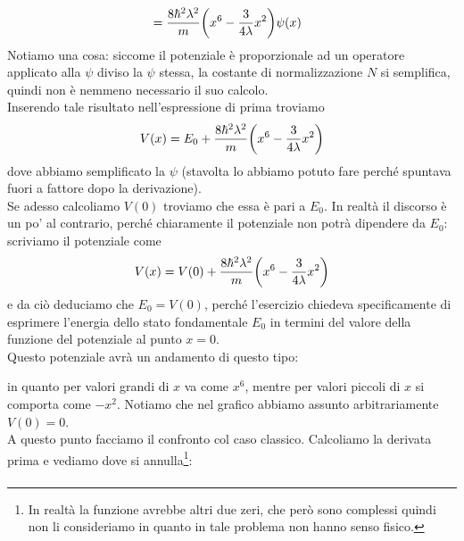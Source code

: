 \begin{soluzione}
\begin{equation*}
\begin{split}
         & =\frac{8 \hbar^2 \lambda^2}{m} \qty( x^6 - \frac{3}{4\lambda}x^2 )\psi(x)
      \end{split}
   \end{equation*}
   Notiamo una cosa: siccome il potenziale è proporzionale ad un operatore applicato alla $\psi$ diviso la $\psi$ stessa, la costante di normalizzazione $N$ si semplifica, quindi non è nemmeno necessario il suo calcolo.\\
   Inserendo tale risultato nell'espressione di prima troviamo
   \begin{equation*}
      V(x)=E_0 + \frac{8 \hbar^2 \lambda^2}{m} \qty( x^6 - \frac{3}{4\lambda}x^2 )
   \end{equation*}
   dove abbiamo semplificato la $\psi$ (stavolta lo abbiamo potuto fare perché spuntava fuori a fattore dopo la derivazione).\\
   Se adesso calcoliamo $V(0)$ troviamo che essa è pari a $E_0$. In realtà il discorso è un po' al contrario, perché chiaramente il potenziale non potrà dipendere da $E_0$: scriviamo il potenziale come
   \begin{equation*}
      V(x)=V(0) + \frac{8 \hbar^2 \lambda^2}{m} \qty( x^6 - \frac{3}{4\lambda}x^2 )
   \end{equation*}
   e da ciò deduciamo che $E_0=V(0)$, perché l'esercizio chiedeva specificamente di esprimere l'energia dello stato fondamentale $E_0$ in termini del valore della funzione del potenziale al punto $x=0$.\\
   Questo potenziale avrà un andamento di questo tipo:
   \begin{figure}[H]
      \centering
   \end{figure}
   in quanto per valori grandi di $x$ va come $x^6$, mentre per valori piccoli di $x$ si comporta come $-x^2$. Notiamo che nel grafico abbiamo assunto arbitrariamente $V(0)=0$.\\
   A questo punto facciamo il confronto col caso classico. Calcoliamo la derivata prima e vediamo dove si annulla\footnote{In realtà la funzione avrebbe altri due zeri, che però sono complessi quindi non li consideriamo in quanto in tale problema non hanno senso fisico.}:
   \begin{gather*}

\end{gather*}
\end{soluzione}
